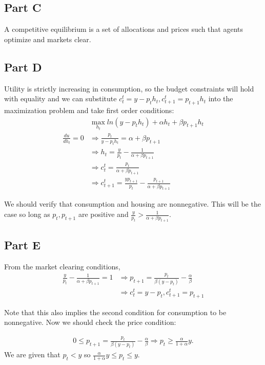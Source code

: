 \documentclass[11pt]{article} %
\begin{document}
\subsection{Part C}
A competitive equilibrium is a set of allocations and prices such that agents optimize and markets clear.
\subsection{Part D}
Utility is strictly increasing in consumption, so the budget constraints will hold with equality and we can substitute $c_t^t = y - p_th_t,c_{t+1}^t = p_{t+1}h_t$ into the maximization problem and take first order conditions:
\begin{align*}
&\max_{h_t} ln(y - p_th_t) + \alpha h_t + \beta p_{t+1}h_t\\
\frac{du}{dh_t} = 0 &\Rightarrow \frac{p_t}{y-p_th_t} = \alpha + \beta p_{t+1}\\
&\Rightarrow h_t = \frac{y}{p_t} - \frac{1}{\alpha + \beta p_{t+1}}\\
&\Rightarrow c_t^t =  \frac{p_t}{\alpha + \beta p_{t+1}} \\
&\Rightarrow c_{t+1}^t =  \frac{yp_{t+1}}{p_t} - \frac{p_{t+1}}{\alpha + \beta p_{t+1}}
\end{align*}

We should verify that consumption and housing are nonnegative. This will be the case so long as $p_t,p_{t+1}$ are positive and $\frac{y}{p_t} > \frac{1}{\alpha + \beta p_{t+1}}.$

\subsection{Part E}
From the market clearing conditions,
\begin{align*}
\frac{y}{p_t} - \frac{1}{\alpha + \beta p_{t+1}} = 1 &\Rightarrow p_{t+1} = \frac{p_t}{\beta(y-p_t)} - \frac{\alpha}{\beta}\\
&\Rightarrow c_t^t = y - p_t,c_{t+1}^t = p_{t+1}
\end{align*}

Note that this also implies the second condition for consumption to be nonnegative. Now we should check the price condition:

\begin{align*}
0\leq p_{t+1} = \frac{p_t}{\beta(y-p_t)} - \frac{\alpha}{\beta} \Rightarrow p_t\geq \frac{\alpha}{1+\alpha}y.
\end{align*}
We are given that $p_t<y$ so $ \frac{\alpha}{1+\alpha}y \leq p_t \leq y$.
\end{document}
